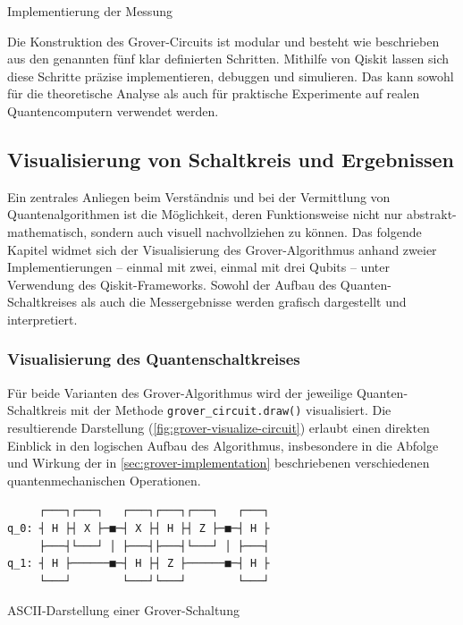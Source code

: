 \begin{listing}[ht!]
  \inputminted{python}{code/grover-measure.py}
  \caption{Implementierung der Messung}
  \label{code:grover-measure}
\end{listing}
 
Die Konstruktion des Grover-Circuits ist modular und besteht wie beschrieben aus den genannten fünf klar definierten Schritten. Mithilfe von Qiskit lassen sich diese Schritte präzise implementieren, debuggen und simulieren. Das kann sowohl für die theoretische Analyse als auch für praktische Experimente auf realen Quantencomputern verwendet werden. \autocite{ibm_quantum_2025} \autocite{noauthor_grovers_nodate}

\subsection{Visualisierung von Schaltkreis und Ergebnissen}

Ein zentrales Anliegen beim Verständnis und bei der Vermittlung von Quantenalgorithmen ist die Möglichkeit, deren Funktionsweise nicht nur abstrakt-mathematisch, sondern auch visuell nachvollziehen zu können. Das folgende Kapitel widmet sich der Visualisierung des Grover-Algorithmus anhand zweier Implementierungen – einmal mit zwei, einmal mit drei Qubits – unter Verwendung des Qiskit-Frameworks. Sowohl der Aufbau des Quanten-Schaltkreises als auch die Messergebnisse werden grafisch dargestellt und interpretiert.

\subsubsection*{Visualisierung des Quantenschaltkreises}
\label{sec:grover-visualization}

Für beide Varianten des Grover-Algorithmus wird der jeweilige Quanten-Schaltkreis mit der Methode \texttt{grover_circuit.draw()} visualisiert. Die resultierende Darstellung (\autoref{fig:grover-visualize-circuit}) erlaubt einen direkten Einblick in den logischen Aufbau des Algorithmus, insbesondere in die Abfolge und Wirkung der in \autoref{sec:grover-implementation} beschriebenen verschiedenen quantenmechanischen Operationen.

\begin{listing}[ht!]
\begin{verbatim}
     ┌───┐┌───┐   ┌───┐┌───┐┌───┐   ┌───┐
q_0: ┤ H ├┤ X ├─■─┤ X ├┤ H ├┤ Z ├─■─┤ H ├
     ├───┤└───┘ │ ├───┤├───┤└───┘ │ ├───┤
q_1: ┤ H ├──────■─┤ H ├┤ Z ├──────■─┤ H ├
     └───┘        └───┘└───┘        └───┘
\end{verbatim}
\caption{ASCII-Darstellung einer Grover-Schaltung}
\label{code:grover-circuit-ascii}
\end{listing}

